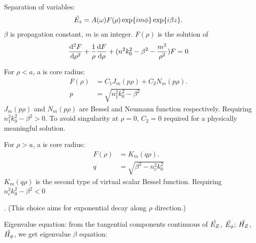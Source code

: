 \documentclass[12pt]{extarticle}
\numberwithin{equation}{section}
\numberwithin{figure}{section}
\numberwithin{table}{section}
\newcommand{\<}{\langle}
\renewcommand{\>}{\rangle}
\theoremstyle{definition}
\newcommand{\SubItem}[1]{
    {\setlength\itemindent{15pt} \item[-] #1}
}
\begin{document}
\begin{itemize}
                \item Separation of variables:
                    \begin{equation}
                        \Tilde{E_z} = A(\omega)F(\rho)\exp{im\phi}\exp{i\beta z}.
                    \end{equation}
                    $\beta$ is propagation constant, $m$ is an integer. $F(\rho)$ is the solution of
                    \begin{equation}
                        \dv[2]{F}{\rho} + \frac{1}{\rho}\dv{F}{\rho}+(n^2k_0^2-\beta^2-\frac{m^2}{\rho^2})F=0
                        \label{Equation F of rho satisfies}
                    \end{equation}
                    \SubItem{For $\rho < a$, a is core radius:
                        \begin{equation}
                            \begin{split}
                                F(\rho)&=C_1 J_m(p\rho)+C_2 N_m(p\rho).\\
                                p &= \sqrt{n_1^2k_0^2-\beta^2}
                                \label{Electric mode in the core}
                            \end{split}
                        \end{equation}
                        $J_m(p\rho)$ and $N_m(p\rho)$ are Bessel and Neumann function respectively. Requiring $n_1^2k_0^2-\beta^2 > 0$. To avoid singularity at $\rho = 0$, $C_2 = 0$ required for a physically meaningful solution.
                    }
                    \SubItem{For $\rho > a$, a is core radius:
                        \begin{equation}
                            \begin{split}
                                F(\rho)&=K_m(q\rho).\\
                                q &= \sqrt{\beta^2-n_c^2k_0^2}
                                \label{Electric mode in the cladder}
                            \end{split}
                        \end{equation}
                        $K_m(q\rho)$ is the second type of virtual scalar Bessel function. Requiring $n_c^2k_0^2-\beta^2 < 0$}. (This choice aims for exponential decay along $\rho$ direction.)
                \item Eigenvalue equation: from the tangential components continuous of $\Tilde{E_Z}$, $\Tilde{E_\phi}$; $\Tilde{H_Z}$, $\Tilde{H_\phi}$, we get eigenvalue $\beta$ equation:

\end{itemize}
\end{document}
